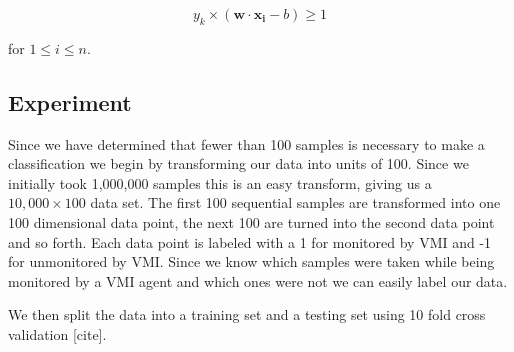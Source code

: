 \begin{equation}\label{SVMFinal}
	y_k \times (\bm{w}\cdot \bm{x_i} - b) \ge 1 
\end{equation}

for $1 \le i \le n$. 

\subsection{Experiment}

Since we have determined that fewer than 100 samples is necessary to make a classification we begin by transforming our data into units of 100. Since we initially took 1,000,000 samples this is an easy transform, giving us a $10,000 \times 100$ data set. The first 100 sequential samples are transformed into one 100 dimensional data point, the next 100 are turned into the second data point and so forth. Each data point is labeled with a 1 for monitored by VMI and -1 for unmonitored by VMI. Since we know which samples were taken while being monitored by a VMI agent and which ones were not we can easily label our data. 

We then split the data into a training set and a testing set using 10 fold cross validation [cite]. 